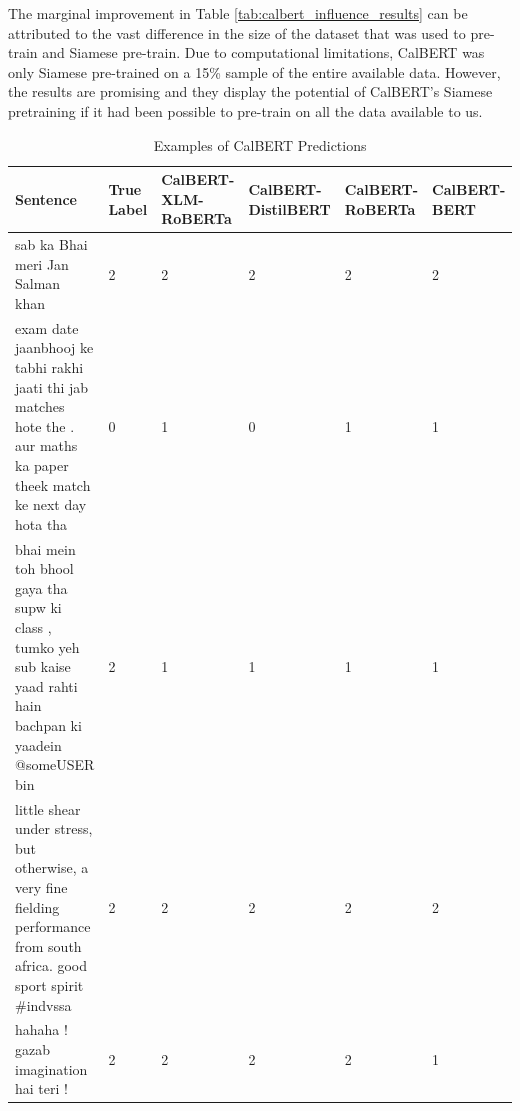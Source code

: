 \documentclass[conference]{IEEEtran}
\begin{document}
The marginal improvement in Table \ref{tab:calbert_influence_results} can be attributed to the vast difference in the size of the dataset that was used to pre-train and Siamese pre-train. Due to computational limitations, CalBERT was only Siamese pre-trained on a 15\% sample of the entire available data. However, the results are promising and they display the potential of CalBERT's Siamese pretraining if it had been possible to pre-train on all the data available to us. 
\begin{table}[]
\caption{Examples of CalBERT Predictions}
\label{tab:calbert_preds}
\begin{tabular}{|p{}|p{}|p{}|p{}|p{}|p{}|}

\hline
\textbf{Sentence}                                                                                                           & \textbf{True Label} & \textbf{CalBERT-XLM-RoBERTa} & \textbf{CalBERT-DistilBERT} & \textbf{CalBERT-RoBERTa} & \textbf{CalBERT-BERT} \\ \hline
sab ka Bhai meri Jan Salman khan                                                                                            & 2                    & 2                            & 2                           & 2                        & 2                     \\ \hline
exam date jaanbhooj ke tabhi rakhi jaati thi jab matches hote the . aur   maths ka paper theek match ke next day hota tha   & 0                    & 1                            & 0                           & 1                        & 1                     \\ \hline
bhai mein toh bhool gaya tha supw ki class , tumko yeh sub kaise yaad   rahti hain bachpan ki yaadein @someUSER bin         & 2                    & 1                            & 1                           & 1                        & 1                     \\ \hline
little shear under stress, but otherwise, a very fine fielding   performance from south africa. good sport spirit \#indvssa & 2                    & 2                            & 2                           & 2                        & 2                     \\ \hline
hahaha ! gazab imagination hai teri !                                                                                       & 2                    & 2                            & 2                           & 2                        & 1                     \\ \hline

\end{tabular}
\end{table}
\end{document}
